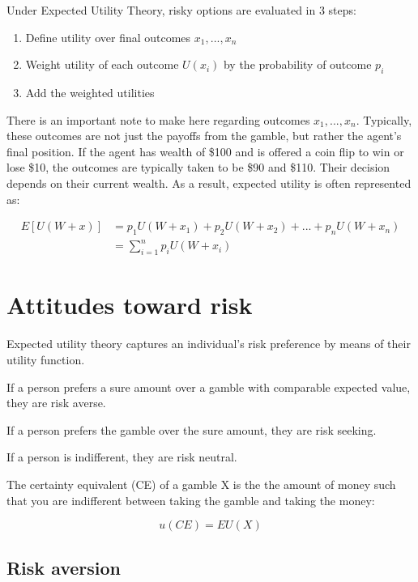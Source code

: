 \documentclass[
  letterpaper,
  DIV=11,
  numbers=noendperiod]{scrreprt}
\begin{document}
Under Expected Utility Theory, risky options are evaluated in 3 steps:

\begin{enumerate}
\def\labelenumi{\arabic{enumi}.}
\item
  Define utility over final outcomes \(x_1, ..., x_n\)
\item
  Weight utility of each outcome \(U(x_i)\) by the probability of
  outcome \(p_i\)
\item
  Add the weighted utilities
\end{enumerate}

There is an important note to make here regarding outcomes
\(x_1, ..., x_n\). Typically, these outcomes are not just the payoffs
from the gamble, but rather the agent's final position. If the agent has
wealth of \$100 and is offered a coin flip to win or lose \$10, the
outcomes are typically taken to be \$90 and \$110. Their decision
depends on their current wealth. As a result, expected utility is often
represented as:

\begin{align*}
E[U(W+x)]&=p_1U(W+x_1)+p_2U(W+x_2)+ ... +p_nU(W+x_n) \\[6pt]
&=\sum_{i=1}^n p_iU(W+x_i)
\end{align*}

\hypertarget{attitudes-toward-risk}{%
\section{Attitudes toward risk}\label{attitudes-toward-risk}}

Expected utility theory captures an individual's risk preference by
means of their utility function.

If a person prefers a sure amount over a gamble with comparable expected
value, they are risk averse.

If a person prefers the gamble over the sure amount, they are risk
seeking.

If a person is indifferent, they are risk neutral.

The certainty equivalent (CE) of a gamble X is the the amount of money
such that you are indifferent between taking the gamble and taking the
money:

\[u(CE)=EU(X)\]

\hypertarget{risk-aversion}{%
\subsection{Risk aversion}\label{risk-aversion}}
\end{document}
